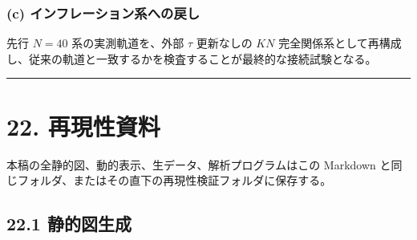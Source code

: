 \documentclass[
  a4paper,
]{ltjsarticle}
\begin{document}
\subsubsection{(c)
インフレーション系への戻し}\label{c-ux30a4ux30f3ux30d5ux30ecux30fcux30b7ux30e7ux30f3ux7cfbux3078ux306eux623bux3057}

先行 \(N=40\) 系の実測軌道を、外部 \(\tau\) 更新なしの \(KN\)
完全関係系として再構成し、従来の軌道と一致するかを検査することが最終的な接続試験となる。

\begin{center}\rule{0.5\linewidth}{0.5pt}\end{center}

\section{22. 再現性資料}\label{ux518dux73feux6027ux8cc7ux6599}

本稿の全静的図、動的表示、生データ、解析プログラムはこの Markdown
と同じフォルダ、またはその直下の再現性検証フォルダに保存する。

\subsection{22.1 静的図生成}\label{ux9759ux7684ux56f3ux751fux6210}
\end{document}
